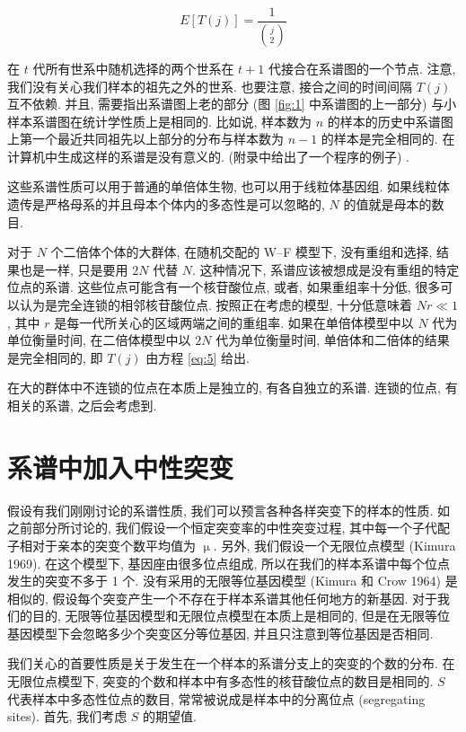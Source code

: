 \documentclass[12pt]{article}
\begin{document}
\begin{equation} \label{eq:5}
    E[T(j)]=\frac{1}{\binom{j}{2}}
\end{equation}

在 $t$ 代所有世系中随机选择的两个世系在 $t+1$ 代接合在系谱图的一个节点. 注意, 我们没有关心我们样本的祖先之外的世系.
也要注意, 接合之间的时间间隔 $T(j)$ 互不依赖. 并且, 需要指出系谱图上老的部分 (图 \ref{fig:1} 中系谱图的上一部分)
与小样本系谱图在统计学性质上是相同的. 比如说, 样本数为 $n$
的样本的历史中系谱图上第一个最近共同祖先以上部分的分布与样本数为 $n-1$ 的样本是完全相同的.
在计算机中生成这样的系谱是没有意义的. (附录中给出了一个程序的例子) .

这些系谱性质可以用于普通的单倍体生物, 也可以用于线粒体基因组. 如果线粒体遗传是严格母系的并且母本个体内的多态性是可以忽略的,
$N$ 的值就是母本的数目.

对于 $N$ 个二倍体个体的大群体, 在随机交配的 W--F 模型下, 没有重组和选择, 结果也是一样, 只是要用 $2N$ 代替 $N$.
这种情况下, 系谱应该被想成是没有重组的特定位点的系谱. 这些位点可能含有一个核苷酸位点, 或者, 如果重组率十分低,
很多可以认为是完全连锁的相邻核苷酸位点. 按照正在考虑的模型, 十分低意味着 $Nr\ll 1$, 其中 $r$
是每一代所关心的区域两端之间的重组率. 如果在单倍体模型中以 $N$ 代为单位衡量时间, 在二倍体模型中以 $2N$ 代为单位衡量时间,
单倍体和二倍体的结果是完全相同的, 即 $T(j)$ 由方程 \ref{eq:5} 给出.

在大的群体中不连锁的位点在本质上是独立的, 有各自独立的系谱. 连锁的位点, 有相关的系谱, 之后会考虑到.

\section{系谱中加入中性突变}

假设有我们刚刚讨论的系谱性质, 我们可以预言各种各样突变下的样本的性质. 如之前部分所讨论的,
我们假设一个恒定突变率的中性突变过程, 其中每一个子代配子相对于亲本的突变个数平均值为 $\upmu$. 另外,
我们假设一个无限位点模型 (Kimura 1969). 在这个模型下, 基因座由很多位点组成,
所以在我们的样本系谱中每个位点发生的突变不多于 1 个. 没有采用的无限等位基因模型 (Kimura 和 Crow 1964) 是相似的,
假设每个突变产生一个不存在于样本系谱其他任何地方的新基因. 对于我们的目的, 无限等位基因模型和无限位点模型在本质上是相同的,
但是在无限等位基因模型下会忽略多少个突变区分等位基因, 并且只注意到等位基因是否相同.

我们关心的首要性质是关于发生在一个样本的系谱分支上的突变的个数的分布. 在无限位点模型下,
突变的个数和样本中有多态性的核苷酸位点的数目是相同的. $S$ 代表样本中多态性位点的数目, 常常被说成是样本中的分离位点
(segregating sites). 首先, 我们考虑 $S$ 的期望值.
\end{document}
